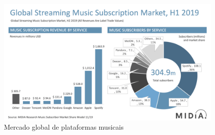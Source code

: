\documentclass{report}
\begin{document}
\begin{figure} 
    \centering
    \includegraphics[width=\textwidth]{Imagens/spotify-global-market-share-1.png}
    \caption{Mercado global de plataformas musicais} \label{fig6:mercado}
\end{figure}
\end{document}

